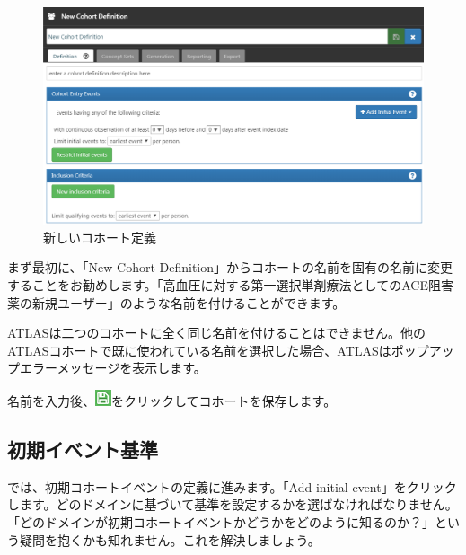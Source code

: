 \documentclass[
  11pt]{book}
\makeatletter
\newenvironment{kframe}{%
\medskip{}
\setlength{\fboxsep}{.8em}
 \def\at@end@of@kframe{}%
 \ifinner\ifhmode%
  \def\at@end@of@kframe{\end{minipage}}%
  \begin{minipage}{\columnwidth}%
 \fi\fi%
 \def\FrameCommand##1{\hskip\@totalleftmargin \hskip-\fboxsep
 \colorbox{myShadeColor}{##1}\hskip-\fboxsep
     \hskip-\linewidth \hskip-\@totalleftmargin \hskip\columnwidth}%
 \MakeFramed {\advance\hsize-\width
   \@totalleftmargin\z@ \linewidth\hsize
   \@setminipage}}%
 {\par\unskip\endMakeFramed%
 \at@end@of@kframe}
\newenvironment{rmdblock}[1]
  {
  \begin{itemize}
  \renewcommand{\labelitemi}{
    \raisebox{-.7\height}[0pt][0pt]{
      {\setkeys{Gin}{width=3em,keepaspectratio}\texttt{[image: images/\#1]}}
    }
  }
  \setlength{\fboxsep}{1em}
  \begin{kframe}
  \item
  }
  {
  \end{kframe}
  \end{itemize}
  }
\newenvironment{rmdimportant}
  {\begin{rmdblock}{important}}
  {\end{rmdblock}}
\theoremstyle{definition}
\theoremstyle{definition}
\theoremstyle{definition}
\theoremstyle{definition}
\theoremstyle{remark}
\makeatother
\begin{document}
\begin{figure}

{\centering \includegraphics[width=1\linewidth]{images/Cohorts/ATLAS-defineacohort} 

}

\caption{新しいコホート定義}\label{fig:ATLASdefineacohort}
\end{figure}

まず最初に、「New Cohort Definition」からコホートの名前を固有の名前に変更することをお勧めします。「高血圧に対する第一選択単剤療法としてのACE阻害薬の新規ユーザー」のような名前を付けることができます。

\begin{rmdimportant}
ATLASは二つのコホートに全く同じ名前を付けることはできません。他のATLASコホートで既に使われている名前を選択した場合、ATLASはポップアップエラーメッセージを表示します。
\end{rmdimportant}

名前を入力後、\includegraphics{images/Cohorts/save.png}をクリックしてコホートを保存します。

\subsection{初期イベント基準}\label{ux521dux671fux30a4ux30d9ux30f3ux30c8ux57faux6e96}

では、初期コホートイベントの定義に進みます。「Add initial event」をクリックします。どのドメインに基づいて基準を設定するかを選ばなければなりません。「どのドメインが初期コホートイベントかどうかをどのように知るのか？」という疑問を抱くかも知れません。これを解決しましょう。
\end{document}
